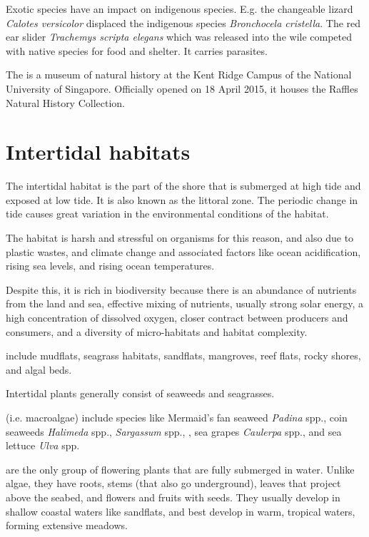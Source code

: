 \documentclass{slnotes}
\newcommand{\scn}[1]{\textit{#1}}
\begin{document}
Exotic species have an impact on indigenous species. E.g. the changeable lizard \scn{Calotes versicolor} displaced the indigenous species \scn{Bronchocela cristella}. The red ear slider \scn{Trachemys scripta elegans} which was released into the wile competed with native species for food and shelter. It carries parasites.

The  is a museum of natural history at the Kent Ridge Campus of the National University of Singapore. Officially opened on 18 April 2015, it houses the Raffles Natural History Collection.
\chapter{Intertidal habitats}
The intertidal habitat is the part of the shore that is submerged at high tide and exposed at low tide. It is also known as the littoral zone. The periodic change in tide causes great variation in the environmental conditions of the habitat.

The habitat is harsh and stressful on organisms for this reason, and also due to plastic wastes, and climate change and associated factors like ocean acidification, rising sea levels, and rising ocean temperatures.

Despite this, it is rich in biodiversity because there is an abundance of nutrients from the land and sea, effective mixing of nutrients, usually strong solar energy, a high concentration of dissolved oxygen, closer contract between producers and consumers, and a diversity of micro-habitats and habitat complexity.

 include mudflats, seagrass habitats, sandflats, mangroves, reef flats, rocky shores, and algal beds.

Intertidal plants generally consist of seaweeds and seagrasses.

 (i.e. macroalgae) include species like Mermaid's fan seaweed \scn{Padina} spp., coin seaweeds \scn{Halimeda} spp., \scn{Sargassum} spp., , sea grapes \scn{Caulerpa} spp., and sea lettuce \scn{Ulva} spp.

 are the only group of flowering plants that are fully submerged in water. Unlike algae, they have roots, stems (that also go underground), leaves that project above the seabed, and flowers and fruits with seeds. They usually develop in shallow coastal waters like sandflats, and best develop in warm, tropical waters, forming extensive meadows.
\end{document}
